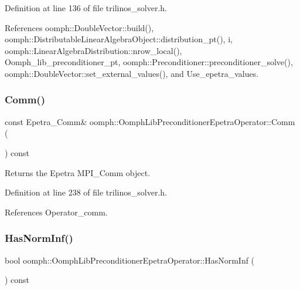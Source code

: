 Definition at line 136 of file trilinos\+\_\+solver.\+h.



References oomph\+::\+Double\+Vector\+::build(), oomph\+::\+Distributable\+Linear\+Algebra\+Object\+::distribution\+\_\+pt(), i, oomph\+::\+Linear\+Algebra\+Distribution\+::nrow\+\_\+local(), Oomph\+\_\+lib\+\_\+preconditioner\+\_\+pt, oomph\+::\+Preconditioner\+::preconditioner\+\_\+solve(), oomph\+::\+Double\+Vector\+::set\+\_\+external\+\_\+values(), and Use\+\_\+epetra\+\_\+values.

\mbox{\label{classoomph_1_1OomphLibPreconditionerEpetraOperator_ade006ce21f59cf90af05b652eca79308}} 
\subsubsection{\texorpdfstring{Comm()}{Comm()}}
{\footnotesize\ttfamily const Epetra\+\_\+\+Comm\& oomph\+::\+Oomph\+Lib\+Preconditioner\+Epetra\+Operator\+::\+Comm (\begin{DoxyParamCaption}{ }\end{DoxyParamCaption}) const\hspace{0.3cm}{\ttfamily [inline]}}



Returns the Epetra M\+P\+I\+\_\+\+Comm object. 



Definition at line 238 of file trilinos\+\_\+solver.\+h.



References Operator\+\_\+comm.

\mbox{\label{classoomph_1_1OomphLibPreconditionerEpetraOperator_a584ad443e96d730d6abbcf6291298545}} 
\subsubsection{\texorpdfstring{Has\+Norm\+Inf()}{HasNormInf()}}
{\footnotesize\ttfamily bool oomph\+::\+Oomph\+Lib\+Preconditioner\+Epetra\+Operator\+::\+Has\+Norm\+Inf (\begin{DoxyParamCaption}{ }\end{DoxyParamCaption}) const\hspace{0.3cm}{\ttfamily [inline]}}



